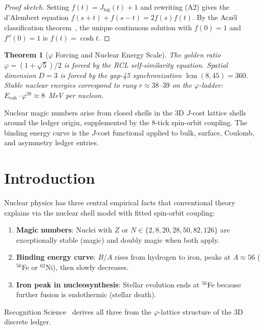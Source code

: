 \documentclass[12pt,a4paper]{article}
\newtheorem{theorem}{Theorem}[section]
\theoremstyle{definition}
\theoremstyle{remark}
\begin{document}
\begin{proof}[Proof sketch]
Setting $f(t) = J_{\log}(t) + 1$ and rewriting \textup{(A2)} gives the
d'Alembert equation $f(s+t) + f(s-t) = 2f(s)f(t)$.  By the Acz\'el
classification theorem~\cite{Aczel1966}, the unique continuous solution
with $f(0) = 1$ and $f''(0) = 1$ is $f(t) = \cosh t$.
\end{proof}

\begin{theorem}[$\varphi$ Forcing and Nuclear Energy Scale]\label{thm:phi}
The golden ratio $\varphi = (1+\sqrt{5})/2$ is forced by the RCL
self-similarity equation.  Spatial dimension $D = 3$ is forced by
the gap-45 synchronization $\operatorname{lcm}(8,45) = 360$.  Stable
nuclear energies correspond to rung $r \approx 38$--$39$ on the
$\varphi$-ladder: $E_{\mathrm{coh}} \cdot \varphi^{38} \approx 8$~MeV
per nucleon.
\end{theorem}

\noindent Nuclear magic numbers arise from closed shells in the 3D
$J$-cost lattice shells around the ledger origin, supplemented by the
8-tick spin-orbit coupling.  The binding energy curve is the $J$-cost
functional applied to bulk, surface, Coulomb, and asymmetry ledger entries.

\section{Introduction}
\label{sec:intro}

Nuclear physics has three central empirical facts that conventional theory explains 
via the nuclear shell model with fitted spin-orbit coupling:

\begin{enumerate}
\item \textbf{Magic numbers}: Nuclei with $Z$ or $N \in \{2, 8, 20, 28, 50, 82, 126\}$ 
are exceptionally stable (magic) and doubly magic when both apply.

\item \textbf{Binding energy curve}: $B/A$ rises from hydrogen to iron, peaks at 
$A \approx 56$ ($^{56}$Fe or $^{62}$Ni), then slowly decreases.

\item \textbf{Iron peak in nucleosynthesis}: Stellar evolution ends at $^{56}$Fe because 
further fusion is endothermic (stellar death).
\end{enumerate}

Recognition Science~\cite{RS_Axioms} derives all three from the
$\varphi$-lattice structure of the 3D discrete ledger.
\end{document}
